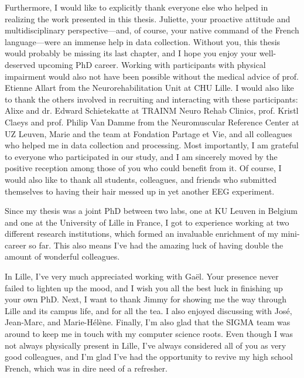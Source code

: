 Furthermore, I would like to explicitly thank everyone else who helped
in realizing the work presented in this thesis. Juliette, your
proactive attitude and multidisciplinary perspective—and, of course,
your native command of the French language—were an immense help in
data collection. Without you, this thesis would probably be missing its
last chapter, and I hope you enjoy your well-deserved upcoming PhD
career. Working with participants with physical impairment would also
not have been possible without the medical advice of prof. Etienne
Allart from the Neurorehabilitation Unit at CHU Lille. I would also
like to thank the others involved in recruiting and interacting with
these participants: Alixe and dr. Edward Schietekatte at TRAINM Neuro
Rehab Clinics, prof. Kristl Claeys and prof. Philip Van Damme from the
Neuromuscular Reference Center at UZ Leuven, Marie and the team at
Fondation Partage et Vie, and all colleagues who helped me in data
collection and processing. Most importantly, I am grateful to everyone
who participated in our study, and I am sincerely moved by the positive
reception among those of you who could benefit from it. Of course, I
would also like to thank all students, colleagues, and friends who
submitted themselves to having their hair messed up in yet another EEG
experiment.

Since my thesis was a joint PhD between two labs, one at KU Leuven in
Belgium and one at the University of Lille in France, I got to
experience working at two different research institutions, which formed
an invaluable enrichment of my mini-career so far. This also means I've
had the amazing luck of having double the amount of wonderful
colleagues.

In Lille, I've very much appreciated working with Gaël. Your presence
never failed to lighten up the mood, and I wish you all the best luck
in finishing up your own PhD. Next, I want to thank Jimmy for showing
me the way through Lille and its campus life, and for all the tea. I
also enjoyed discussing with José, Jean-Marc, and Marie-Hélène. Finally,
I'm also glad that the SIGMA team was around to keep me in touch with
my computer science roots. Even though I was not always physically
present in Lille, I've always considered all of you as very good
colleagues, and I'm glad I've had the opportunity to revive my high
school French, which was in dire need of a refresher.

